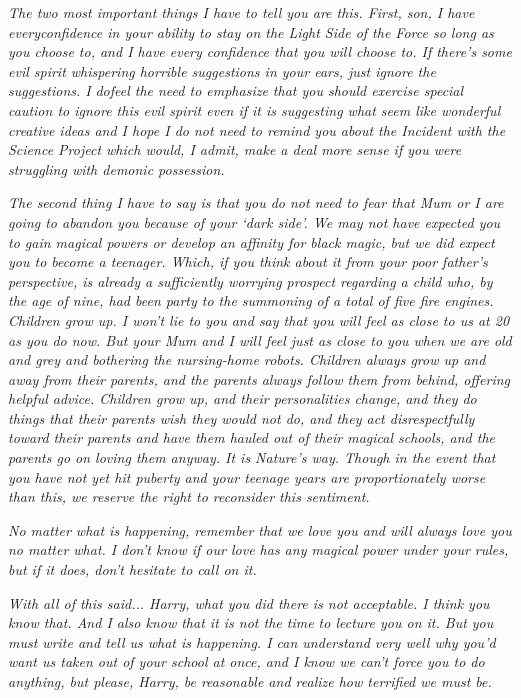 \emph{The two most important things I have to tell you are this. First,
son, I have} \emph{every}\emph{confidence in your ability to stay on the
Light Side of the Force so long as you choose to, and I have every
confidence that you will choose to. If there's some evil spirit
whispering horrible suggestions in your ears, just ignore the
suggestions. I} \emph{do}\emph{feel the need to emphasize that you
should exercise special caution to ignore this evil spirit even if it is
suggesting what seem like wonderful creative ideas and I hope I do not
need to remind you about the Incident with the Science Project which
would, I admit, make a deal more sense if you were struggling with
demonic possession.}

\emph{The second thing I have to say is that you do not need to fear
that Mum or I are going to abandon you because of your `dark side'. We
may not have expected you to gain magical powers or develop an affinity
for black magic, but we did expect you to become a teenager. Which, if
you think about it from your poor father's perspective, is already a
sufficiently worrying prospect regarding a child who, by the age of
nine, had been party to the summoning of a total of five fire engines.
Children grow up. I won't lie to you and say that you will feel as close
to us at 20 as you do now. But your Mum and I will feel just as close to
you when we are old and grey and bothering the nursing-home robots.
Children always grow up and away from their parents, and the parents
always follow them from behind, offering helpful advice. Children grow
up, and their personalities change, and they do things that their
parents wish they would not do, and they act disrespectfully toward
their parents and have them hauled out of their magical schools, and the
parents go on loving them anyway. It is Nature's way. Though in the
event that you have not yet hit puberty and your teenage years are
proportionately worse than this, we reserve the right to reconsider this
sentiment.}

\emph{No matter what is happening, remember that we love you and will
always love you no matter what. I don't know if our love has any magical
power under your rules, but if it does, don't hesitate to call on it.}

\emph{With all of this said... Harry, what you did there is not
acceptable. I think you know that. And I also know that it is not the
time to lecture you on it. But you must write and tell us what is
happening. I can understand very well why you'd want us taken out of
your school at once, and I know we can't force you to do anything, but
please, Harry, be reasonable and realize how terrified we must be.}

